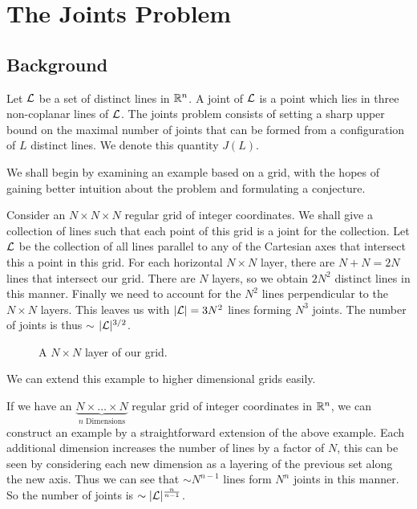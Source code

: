 \chapter{The Joints Problem}

\section{Background}
Let $\mathcal L$ be a set of distinct lines in $\mathbb R^n$. A joint of $\mathcal L$ is a point which lies in three non-coplanar lines of $\mathcal L$.
The joints problem consists of setting a sharp upper bound on the maximal number of joints that can be formed from a configuration of $L$ distinct lines.
We denote this quantity $J(L)$. 

We shall begin by examining an example based on a grid, with the hopes of gaining better intuition about the problem and formulating a conjecture. 
\begin{example}Consider an $N \times N \times N$ regular grid of integer coordinates. We shall give a collection of lines such that each point of this grid is a joint for the collection.
Let $\mathcal L$ be the collection of all lines parallel to any of the Cartesian axes that intersect this a point in this grid.
For each horizontal $N \times N$ layer, there are $N+N = 2N$ lines that intersect our grid. 
There are $N$ layers, so we obtain $2N^2$ distinct lines in this manner. Finally we need to account for the $N^2$ lines perpendicular to the $N\times N$ layers.
This leaves us with $|\mathcal L| = 3 N^2$ lines forming $N^3$ joints. The number of joints is thus $\sim$ $|\mathcal L|^{3/2}$. 
\end{example}
\begin{figure}[h]
    \centering
{}
\caption{A $N \times N$ layer of our grid.}
\end{figure}

We can extend this example to higher dimensional grids easily. 
\begin{example}
    

If we have an $\underbrace{N \times \dots \times N}_{n \text{ Dimensions}}$ regular grid of integer coordinates in $\mathbb R^n$, we can construct an example  by a straightforward extension
of the above example. Each additional dimension increases the number of lines by a factor of $N$, this can be seen by considering each new dimension as a layering of the previous set along the new axis.
Thus we can see that $\sim N^{n-1}$ lines form $N^n$ joints in this manner. So the number of joints is $\sim |\mathcal L|^{\frac{n}{n-1}}$.
\end{example}

